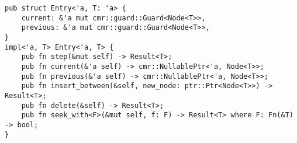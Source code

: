 \begin{lstlisting}[caption=Partial \code{Entry} API from the List implementation.,
                   label={lst:list-entry}]
pub struct Entry<'a, T: 'a> {
    current: &'a mut cmr::guard::Guard<Node<T>>,
    previous: &'a mut cmr::guard::Guard<Node<T>>,
}
impl<'a, T> Entry<'a, T> {
    pub fn step(&mut self) -> Result<T>;
    pub fn current(&'a self) -> cmr::NullablePtr<'a, Node<T>>;
    pub fn previous(&'a self) -> cmr::NullablePtr<'a, Node<T>>;
    pub fn insert_between(&self, new_node: ptr::Ptr<Node<T>>) -> Result<T>;
    pub fn delete(&self) -> Result<T>;
    pub fn seek_with<F>(&mut self, f: F) -> Result<T> where F: Fn(&T) -> bool;
}
\end{lstlisting}
